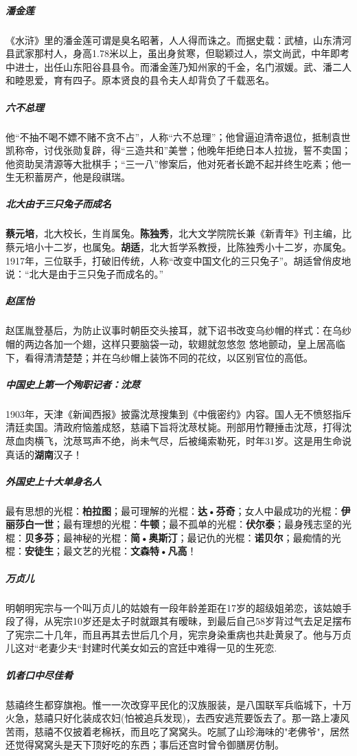 \documentclass[UTF8,a4paper,12pt]{ctexbook}
\begin{document}
		\subparagraph{潘金莲}《水浒》里的潘金莲可谓是臭名昭著，人人得而诛之。而据史载：武植，山东清河县武家那村人，身高1.78米以上，虽出身贫寒，但聪颖过人，崇文尚武，中年即考中进士，出任山东阳谷县县令。而潘金莲乃知州家的千金，名门淑媛。武、潘二人和睦恩爱，育有四子。原本贤良的县令夫人却背负了千载恶名。
		
		\subparagraph{六不总理}他“不抽不喝不嫖不赌不贪不占”，人称“六不总理”；他曾逼迫清帝退位，抵制袁世凯称帝，讨伐张勋复辟，得“三造共和”美誉；他晚年拒绝日本人拉拢，誓不卖国；他资助吴清源等大批棋手；“三一八”惨案后，他对死者长跪不起并终生吃素；他一生无积蓄房产，他是段祺瑞。
	
		\subparagraph{北大由于三只兔子而成名}\textbf{蔡元培}，北大校长，生肖属兔。\textbf{陈独秀}，北大文学院院长兼《新青年》刊主编，比蔡元培小十二岁，也属兔。\textbf{胡适}，北大哲学系教授，比陈独秀小十二岁，亦属兔。1917年，三位联手，打破旧传统，人称“改变中国文化的三只兔子”。胡适曾俏皮地说：“北大是由于三只兔子而成名的。”
		
		\subparagraph{赵匡怡}赵匡胤登基后，为防止议事时朝臣交头接耳，就下诏书改变乌纱帽的样式：在乌纱帽的两边各加一个翅，这样只要脑袋一动，软翅就忽悠忽 悠地颤动，皇上居高临下，看得清清楚楚；并在乌纱帽上装饰不同的花纹，以区别官位的高低。
		
		\subparagraph{中国史上第一个殉职记者：沈荩}1903年，天津《新闻西报》披露沈荩搜集到《中俄密约》内容。国人无不愤怒指斥清廷卖国。清政府恼羞成怒，慈禧下旨将沈荩杖毙。刑部用竹鞭捶击沈荩，打得沈荩血肉横飞，沈荩骂声不绝，尚未气尽，后被绳索勒死，时年31岁。这是用生命说真话的\textbf{湖南}汉子！
		
		\subparagraph{外国史上十大单身名人}最有思想的光棍：\textbf{柏拉图}；最可理解的光棍：\textbf{达•芬奇}；女人中最成功的光棍：\textbf{伊丽莎白一世}；最有理想的光棍：\textbf{牛顿}；最不孤单的光棍：\textbf{伏尔泰}；最身残志坚的光棍：\textbf{贝多芬}；最神秘的光棍：\textbf{简•奥斯汀}；最记仇的光棍：\textbf{诺贝尔}；最痴情的光棍：\textbf{安徒生}；最文艺的光棍：\textbf{文森特•凡高}！
		
		\subparagraph{万贞儿}明朝明宪宗与一个叫万贞儿的姑娘有一段年龄差距在17岁的超级姐弟恋，该姑娘手段了得，从宪宗10岁还是太子时就跟其有暧昧，到最后自己58岁背过气去足足摆布了宪宗二十几年，而且再其去世后几个月，宪宗身染重病也共赴黄泉了。他与万贞儿这对“老妻少夫“封建时代美女如云的宫廷中难得一见的生死恋.
		
		\subparagraph{饥者口中尽佳肴}慈禧终生都穿旗袍。惟一一次改穿平民化的汉族服装，是八国联军兵临城下，十万火急，慈禧只好化装成农妇(怕被追兵发现)，去西安逃荒要饭去了。那一路上凄风苦雨，慈禧不仅披着老棉袄，而且吃了窝窝头。吃腻了山珍海味的"老佛爷"，居然还觉得窝窝头是天下顶好吃的东西；事后还宫时曾令御膳房仿制。
		
\end{document}
